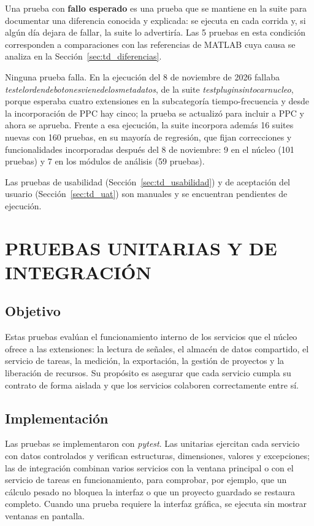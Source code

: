 \documentclass[12pt,letterpaper,oneside]{article}
\DeclareRobustCommand{\_}{\textunderscore\allowbreak}
\newcommand{\capitulo}[1]{\clearpage\section{#1}}
\begin{document}
Una prueba con \textbf{fallo esperado} es una prueba que se mantiene en la suite para documentar una diferencia conocida y explicada: se ejecuta en cada corrida y, si algún día dejara de fallar, la suite lo advertiría. Las 5 pruebas en esta condición corresponden a comparaciones con las referencias de MATLAB cuya causa se analiza en la Sección~\ref{sec:td_diferencias}.

Ninguna prueba falla. En la ejecución del 8 de noviembre de 2026 fallaba \textit{test\_el\_orden\_de\_botones\_viene\_de\_los\_metadatos}, de la suite \textit{test\_plugin\_sin\_tocar\_nucleo}, porque esperaba cuatro extensiones en la subcategoría tiempo-frecuencia y desde la incorporación de PPC hay cinco; la prueba se actualizó para incluir a PPC y ahora se aprueba. Frente a esa ejecución, la suite incorpora además 16 suites nuevas con 160 pruebas, en su mayoría de regresión, que fijan correcciones y funcionalidades incorporadas después del 8 de noviembre: 9 en el núcleo (101 pruebas) y 7 en los módulos de análisis (59 pruebas).

Las pruebas de usabilidad (Sección~\ref{sec:td_usabilidad}) y de aceptación del usuario (Sección~\ref{sec:td_uat}) son manuales y se encuentran pendientes de ejecución.
\capitulo{PRUEBAS UNITARIAS Y DE INTEGRACIÓN}
\label{sec:td_unitarias}

\subsection{Objetivo}
Estas pruebas evalúan el funcionamiento interno de los servicios que el núcleo ofrece a las extensiones: la lectura de señales, el almacén de datos compartido, el servicio de tareas, la medición, la exportación, la gestión de proyectos y la liberación de recursos. Su propósito es asegurar que cada servicio cumpla su contrato de forma aislada y que los servicios colaboren correctamente entre sí.

\subsection{Implementación}
Las pruebas se implementaron con \textit{pytest}. Las unitarias ejercitan cada servicio con datos controlados y verifican estructuras, dimensiones, valores y excepciones; las de integración combinan varios servicios con la ventana principal o con el servicio de tareas en funcionamiento, para comprobar, por ejemplo, que un cálculo pesado no bloquea la interfaz o que un proyecto guardado se restaura completo. Cuando una prueba requiere la interfaz gráfica, se ejecuta sin mostrar ventanas en pantalla.
\end{document}
